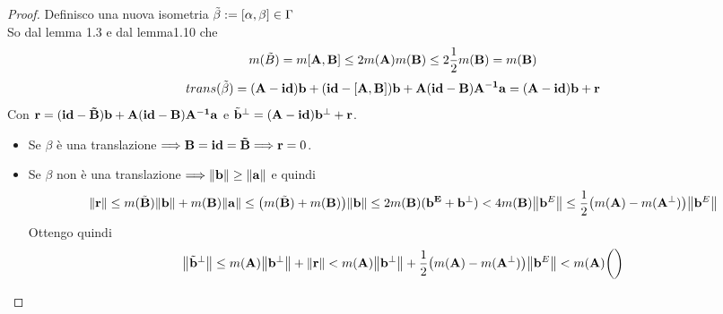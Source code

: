 \documentclass[10pt,a4paper]{article}
\begin{document}
\begin{proof}
\begin{minipage}{0.5\textwidth}
\end{minipage}
Definisco una nuova isometria $ \tilde{\beta} := [\vb{\alpha,\beta}] \in \Gamma$  \\
So dal lemma 1.3 e dal lemma1.10 che
\[ m(\tilde{B} ) = m[\vb{A,B}] \leq 2m(\vb{A}) m(\vb{B}) \leq 2 \frac{1}{2}m(\vb{B}) = m(\vb{B}) \]
\[ trans( \tilde{\beta}) = \vb{(A-id)b + (id-[A,B])b + A(id-B)A^{-1}a} = \vb{(A-id)b + r}\]
Con $\vb{r} = \vb{(id-\tilde{B})b + A(id-B)A^{-1}a}$ e $\tilde{\vb{b}}^{\perp} =  \vb{(A-id)b^{\perp} + r}$.
\begin{itemize}
\item Se $\beta$  è una translazione $\Longrightarrow \vb{B = id = \tilde{B}} \Longrightarrow \vb{r} = 0$. 
\item Se $\beta$ non è una translazione $\Longrightarrow \norm{\vb{b}} \geq \norm{\vb{a}}$  e quindi \\
\[ \norm{\vb{r}} \leq m(\tilde{\vb{B}}) \norm{\vb{b}} + m(\vb{B}) \norm{\vb{a}} \leq \big( m(\tilde{\vb{B}}) + m(\vb{B}) \big) \norm{\vb{b}} \leq 2m(\vb{B})(\vb{b^{E}+ b^{\perp}}) < 4 m(\vb{B}) \norm{\vb{b}^{E}} \leq \frac{1}{2} \big( m(\vb{A}) - m(\vb{A}^{\perp}) \big)\norm{\vb{b}^{E}} \]
Ottengo quindi
\[ \norm{\tilde{\vb{b}}^{\perp}} \leq  m(\vb{A}) \norm{\vb{b}^{\perp}} + \norm{\vb{r}} < m(\vb{A}) \norm{\vb{b}^{\perp}} + \frac{1}{2} \big( m(\vb{A}) - m(\vb{A}^{\perp}) \big)\norm{\vb{b}^{E}} < m(\vb{A})  \bigg(  \bigg)  \] 
\end{itemize}

\end{proof}
\end{document}
